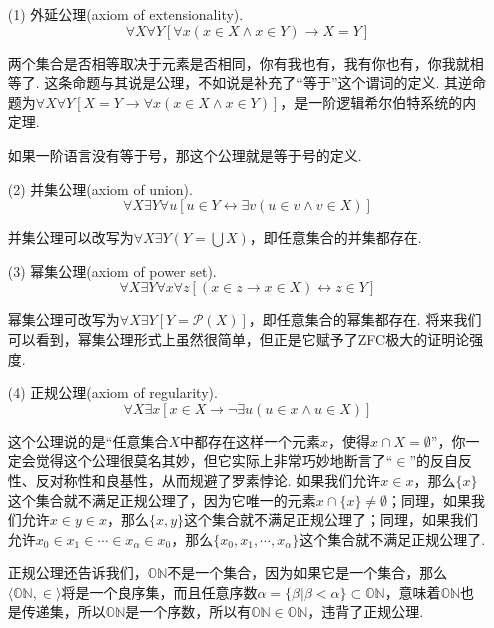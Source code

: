 \documentclass[main.tex]{subfiles}
\begin{document}
\begin{itemize}

    \item[(1)] 外延公理(axiom of extensionality).
    \[\forall X \forall Y[\forall x(x \in X \wedge x \in Y) \rightarrow X=Y]\]
    \begin{note}
        两个集合是否相等取决于元素是否相同，你有我也有，我有你也有，你我就相等了. 这条命题与其说是公理，不如说是补充了“等于”这个谓词的定义. 其逆命题为\(\forall X \forall Y[X=Y \rightarrow \forall x(x \in X \wedge x \in Y)]\)，是一阶逻辑希尔伯特系统的内定理. 

        如果一阶语言没有等于号，那这个公理就是等于号的定义.
    \end{note}

    \item[(2)] 并集公理(axiom of union).
    \[\forall X \exists Y \forall u[u \in Y \leftrightarrow \exists v(u \in v \wedge v \in X)]\]
    \begin{note}
        并集公理可以改写为\(\displaystyle{\forall X \exists Y(Y=\bigcup X)}\)，即任意集合的并集都存在.
    \end{note}

    \item[(3)] 幂集公理(axiom of power set).
    \[\forall X \exists Y \forall x\forall z[(x \in z \rightarrow x \in X) \leftrightarrow z \in Y]\]
    \begin{note}
        幂集公理可改写为\(\forall X \exists Y[Y=\mathcal{P}(X)]\)，即任意集合的幂集都存在. 将来我们可以看到，幂集公理形式上虽然很简单，但正是它赋予了\textsf{ZFC}极大的证明论强度.
    \end{note}

    \item[(4)] 正规公理(axiom of regularity).
    \[\forall X \exists x[x \in X \rightarrow \neg\exists u(u \in x \wedge u \in X)]\]
    \begin{note}
        这个公理说的是“任意集合\(X\)中都存在这样一个元素\(x\)，使得\(x \cap X=\emptyset\)”，你一定会觉得这个公理很莫名其妙，但它实际上非常巧妙地断言了“\(\in\)”的反自反性、反对称性和良基性，从而规避了罗素悖论. 如果我们允许\(x \in x\)，那么\(\{x\}\)这个集合就不满足正规公理了，因为它唯一的元素\(x \cap \{x\} \neq \emptyset\)；同理，如果我们允许\(x \in y \in x\)，那么\(\{x,y\}\)这个集合就不满足正规公理了；同理，如果我们允许\(x_0 \in x_1 \in \cdots \in x_\alpha \in x_0\)，那么\(\{x_0,x_1,\cdots,x_\alpha\}\)这个集合就不满足正规公理了.

        正规公理还告诉我们，\(\mathbb{ON}\)不是一个集合，因为如果它是一个集合，那么\(\langle \mathbb{ON}, \in \rangle\)将是一个良序集，而且任意序数\(\alpha=\{\beta|\beta < \alpha\} \subset \mathbb{ON}\)，意味着\(\mathbb{ON}\)也是传递集，所以\(\mathbb{ON}\)是一个序数，所以有\(\mathbb{ON} \in \mathbb{ON}\)，违背了正规公理. 


\end{note}
\end{itemize}
\end{document}
